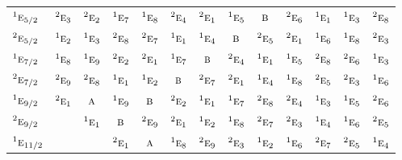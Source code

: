 \documentclass[10pt,a4paper]{article}
\numberwithin{equation}{section}
\newcommand{\irr}[1]{\text{\normalfont\scshape #1}}
\newcommand{\conjpair}[1]{{}^{#1}}
\begin{document}
{\begin{longtable}{@{}lcccccccccccc@{}}
$\conjpair{1}\irr{e}_{5/2}$ & $\conjpair{2}\irr{e}_{3}$ & $\conjpair{2}\irr{e}_{2}$ & $\conjpair{1}\irr{e}_{7}$ & $\conjpair{1}\irr{e}_{8}$ & $\conjpair{2}\irr{e}_{4}$ & $\conjpair{2}\irr{e}_{1}$ & $\conjpair{1}\irr{e}_{5}$ & $\irr{b}$ & $\conjpair{2}\irr{e}_{6}$ & $\conjpair{1}\irr{e}_{1}$ & $\conjpair{1}\irr{e}_{3}$ & $\conjpair{2}\irr{e}_{8}$\\
$\conjpair{2}\irr{e}_{5/2}$ & $\conjpair{1}\irr{e}_{2}$ & $\conjpair{1}\irr{e}_{3}$ & $\conjpair{2}\irr{e}_{8}$ & $\conjpair{2}\irr{e}_{7}$ & $\conjpair{1}\irr{e}_{1}$ & $\conjpair{1}\irr{e}_{4}$ & $\irr{b}$ & $\conjpair{2}\irr{e}_{5}$ & $\conjpair{2}\irr{e}_{1}$ & $\conjpair{1}\irr{e}_{6}$ & $\conjpair{1}\irr{e}_{8}$ & $\conjpair{2}\irr{e}_{3}$\\
$\conjpair{1}\irr{e}_{7/2}$ & $\conjpair{1}\irr{e}_{8}$ & $\conjpair{1}\irr{e}_{9}$ & $\conjpair{2}\irr{e}_{2}$ & $\conjpair{2}\irr{e}_{1}$ & $\conjpair{1}\irr{e}_{7}$ & $\irr{b}$ & $\conjpair{2}\irr{e}_{4}$ & $\conjpair{1}\irr{e}_{1}$ & $\conjpair{1}\irr{e}_{5}$ & $\conjpair{2}\irr{e}_{8}$ & $\conjpair{2}\irr{e}_{6}$ & $\conjpair{1}\irr{e}_{3}$\\
$\conjpair{2}\irr{e}_{7/2}$ & $\conjpair{2}\irr{e}_{9}$ & $\conjpair{2}\irr{e}_{8}$ & $\conjpair{1}\irr{e}_{1}$ & $\conjpair{1}\irr{e}_{2}$ & $\irr{b}$ & $\conjpair{2}\irr{e}_{7}$ & $\conjpair{2}\irr{e}_{1}$ & $\conjpair{1}\irr{e}_{4}$ & $\conjpair{1}\irr{e}_{8}$ & $\conjpair{2}\irr{e}_{5}$ & $\conjpair{2}\irr{e}_{3}$ & $\conjpair{1}\irr{e}_{6}$\\
$\conjpair{1}\irr{e}_{9/2}$ & $\conjpair{2}\irr{e}_{1}$ & $\irr{a}$ & $\conjpair{1}\irr{e}_{9}$ & $\irr{b}$ & $\conjpair{2}\irr{e}_{2}$ & $\conjpair{1}\irr{e}_{1}$ & $\conjpair{1}\irr{e}_{7}$ & $\conjpair{2}\irr{e}_{8}$ & $\conjpair{2}\irr{e}_{4}$ & $\conjpair{1}\irr{e}_{3}$ & $\conjpair{1}\irr{e}_{5}$ & $\conjpair{2}\irr{e}_{6}$\\
$\conjpair{2}\irr{e}_{9/2}$ &  & $\conjpair{1}\irr{e}_{1}$ & $\irr{b}$ & $\conjpair{2}\irr{e}_{9}$ & $\conjpair{2}\irr{e}_{1}$ & $\conjpair{1}\irr{e}_{2}$ & $\conjpair{1}\irr{e}_{8}$ & $\conjpair{2}\irr{e}_{7}$ & $\conjpair{2}\irr{e}_{3}$ & $\conjpair{1}\irr{e}_{4}$ & $\conjpair{1}\irr{e}_{6}$ & $\conjpair{2}\irr{e}_{5}$\\
$\conjpair{1}\irr{e}_{11/2}$ &  &  & $\conjpair{2}\irr{e}_{1}$ & $\irr{a}$ & $\conjpair{1}\irr{e}_{8}$ & $\conjpair{2}\irr{e}_{9}$ & $\conjpair{2}\irr{e}_{3}$ & $\conjpair{1}\irr{e}_{2}$ & $\conjpair{1}\irr{e}_{6}$ & $\conjpair{2}\irr{e}_{7}$ & $\conjpair{2}\irr{e}_{5}$ & $\conjpair{1}\irr{e}_{4}$\\

\end{longtable}}
\end{document}

